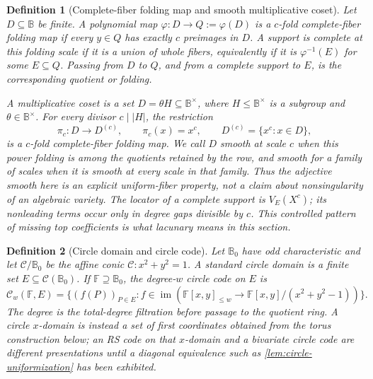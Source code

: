 \documentclass[11pt,a4paper]{amsart}
\numberwithin{equation}{section}
\newtheorem{definition}[definition]{Definition}
\theoremstyle{remark}
\newcommand{\F}{\mathbb F}
\newcommand{\B}{\mathbb B}
\newcommand{\abs}[1]{\lvert #1\rvert}
\begin{document}
\begin{definition}[Complete-fiber folding map and smooth multiplicative coset]
\label{def:structured-folding}
Let \(D\subseteq\B\) be finite.  A polynomial map
\(\varphi:D\to Q:=\varphi(D)\) is a \emph{\(c\)-fold
complete-fiber folding map} if every \(y\in Q\) has exactly \(c\)
preimages in \(D\).  A support is \emph{complete at this folding scale}
if it is a union of whole fibers, equivalently if it is
\(\varphi^{-1}(E)\) for some \(E\subseteq Q\).  Passing from \(D\) to
\(Q\), and from a complete support to \(E\), is the corresponding
\emph{quotient} or \emph{folding}.

A \emph{multiplicative coset} is a set \(D=\theta H\subseteq\B^\times\),
where \(H\le\B^\times\) is a subgroup and \(\theta\in\B^\times\).
For every divisor \(c\mid\abs H\), the restriction
\[
             \pi_c:D\longrightarrow D^{(c)},\qquad
             \pi_c(x)=x^c,\qquad
             D^{(c)}=\{x^c:x\in D\},
\]
is a \(c\)-fold complete-fiber folding map.  We call \(D\)
\emph{smooth at scale \(c\)} when this power folding is among the
quotients retained by the row, and \emph{smooth} for a family of scales
when it is smooth at every scale in that family.  Thus the adjective
\emph{smooth} here is an explicit uniform-fiber property, not a claim
about nonsingularity of an algebraic variety.  The locator of a complete
support is \(V_E(X^c)\); its nonleading terms occur only in degree gaps
divisible by \(c\).  This controlled pattern of missing top coefficients
is what \emph{lacunary} means in this section.
\end{definition}

\begin{definition}[Circle domain and circle code]
\label{def:circle-domain-code}
Let \(\B_0\) have odd characteristic and let
\(\mathcal C/\B_0\) be the affine conic
\(\mathcal C:x^2+y^2=1\).  A \emph{standard circle domain} is a finite
set \(E\subseteq\mathcal C(\B_0)\).  If \(\F\supseteq\B_0\), the
degree-\(w\) \emph{circle code} on \(E\) is
\[
 \mathcal C_w(\F,E)
 =\{(f(P))_{P\in E}:
      f\in\operatorname{im}(\F[x,y]_{\le w}
          \to\F[x,y]/(x^2+y^2-1))\}.
\]
The degree is the total-degree filtration before passage to the quotient
ring.  A \emph{circle \(x\)-domain} is instead a set of first
coordinates obtained from the torus construction below; an RS code on
that \(x\)-domain and a bivariate circle code are different presentations
until a diagonal equivalence such as
\cref{lem:circle-uniformization} has been exhibited.
\end{definition}
\end{document}
